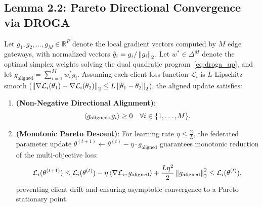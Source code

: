 \subsection{Lemma 2.2: Pareto Directional Convergence via DROGA}
\label{subsec:proof_lemma2}

\begin{lemma}
\label{lem:pareto_convergence}
Let $g_1, g_2, \dots, g_M \in \mathbb{R}^P$ denote the local gradient vectors computed by $M$ edge gateways, with normalized vectors $\hat{g}_i = g_i / \left\lVert g_i\right\rVert_2$. Let $w^* \in \Delta^M$ denote the optimal simplex weights solving the dual quadratic program~\eqref{eq:droga_qp}, and let $g_{\text{aligned}} = \sum_{i=1}^M w_i^* g_i$. Assuming each client loss function $\mathcal{L}_i$ is $L$-Lipschitz smooth ($\left\lVert\nabla \mathcal{L}_i(\theta_1) - \nabla \mathcal{L}_i(\theta_2)\right\rVert_2 \le L \left\lVert\theta_1 - \theta_2\right\rVert_2$), the aligned update satisfies:
\begin{enumerate}
    \item \textbf{(Non-Negative Directional Alignment)}:
    \begin{equation}
    \label{eq:lem2_non_negative}
    \left\langle g_{\text{aligned}},g_i\right\rangle \ge 0 \quad \forall i \in \{1, \dots, M\}.
    \end{equation}
    \item \textbf{(Monotonic Pareto Descent)}: For learning rate $\eta \le \frac{2}{L}$, the federated parameter update $\theta^{(t+1)} \leftarrow \theta^{(t)} - \eta \cdot g_{\text{aligned}}$ guarantees monotonic reduction of the multi-objective loss:
    \begin{equation}
    \label{eq:lem2_descent}
    \mathcal{L}_i(\theta^{(t+1)}) \le \mathcal{L}_i(\theta^{(t)}) - \eta \left\langle\nabla \mathcal{L}_i,g_{\text{aligned}}\right\rangle + \frac{L \eta^2}{2} \left\lVert g_{\text{aligned}}\right\rVert_2^2 \le \mathcal{L}_i(\theta^{(t)}),
    \end{equation}
    preventing client drift and ensuring asymptotic convergence to a Pareto stationary point.
\end{enumerate}
\end{lemma}

